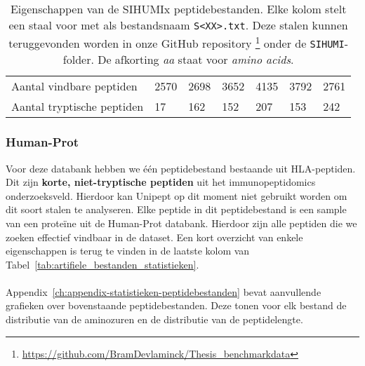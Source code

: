 \begin{table}[H]
\begin{minipage}{\linewidth}
{\begin{tabular}{ l l l l l l l }
                Aantal vindbare peptiden   & 2570                & 2698                & 3652                & 4135                & 3792                & 2761                \\
                Aantal tryptische peptiden & 17\thinspace263     & 162                 & 152                 & 207                 & 153                 & 242                 \\
                \hline
            \end{tabular}}
        \caption{Eigenschappen van de SIHUMIx peptidebestanden. Elke kolom stelt een staal voor met als bestandsnaam \texttt{S<XX>.txt}. Deze stalen kunnen teruggevonden worden in onze GitHub repository \protect\footnote{\url{https://github.com/BramDevlaminck/Thesis\_benchmarkdata}} onder de \texttt{SIHUMI}-folder. De afkorting \textit{aa} staat voor \textit{amino acids}.} %
        \label{tab:sihumi_zoekbestanden}
    \end{minipage}
\end{table}

\subsubsection{Human-Prot}
Voor deze databank hebben we één peptidebestand bestaande uit HLA-peptiden.
Dit zijn \textbf{korte, niet-tryptische peptiden} uit het immunopeptidomics onderzoeksveld.
Hierdoor kan Unipept op dit moment niet gebruikt worden om dit soort stalen te analyseren.
Elke peptide in dit peptidebestand is een sample van een proteïne uit de Human-Prot databank.
Hierdoor zijn alle peptiden die we zoeken effectief vindbaar in de dataset.
Een kort overzicht van enkele eigenschappen is terug te vinden in de laatste kolom van Tabel~\ref{tab:artifiele_bestanden_statistieken}.
\\ \\
Appendix~\ref{ch:appendix-statistieken-peptidebestanden} bevat aanvullende grafieken over bovenstaande peptidebestanden.
Deze tonen voor elk bestand de distributie van de aminozuren en de distributie van de peptidelengte.


